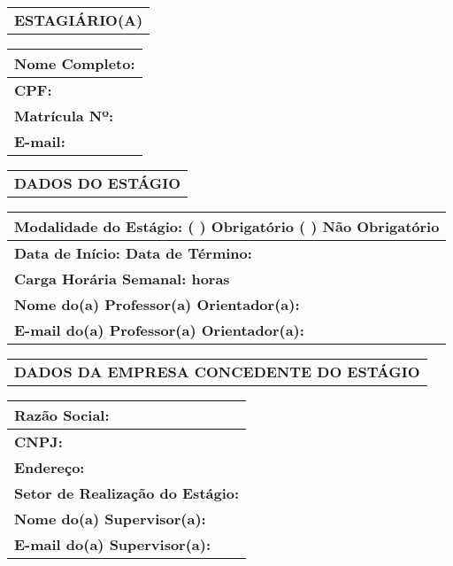 \documentclass[12pt]{article}
\begin{document}
\begin{table}[!ht]
    \centering
    \renewcommand{\arraystretch}{1.3}
    \setlength{\tabcolsep}{10pt}

    \begin{tabular}{p{14cm}} %
        \rowcolor[HTML]{D9D9D9} \textbf{ESTAGIÁRIO(A)} \\
    \end{tabular}

    \begin{tabular}{|p{14cm}|} %
        \hline
        \textbf{Nome Completo:} \\ \hline
        \textbf{CPF:} \\ \hline
        \textbf{Matrícula Nº:} \\ \hline
        \textbf{E-mail:} \\ \hline
    \end{tabular}

    \begin{tabular}{p{14cm}} %
        \rowcolor[HTML]{D9D9D9} \textbf{DADOS DO ESTÁGIO} \\
    \end{tabular}

    \begin{tabular}{|p{14cm}|} %
        \hline
        \textbf{Modalidade do Estágio: (  ) Obrigatório \quad (  ) Não Obrigatório} \\ \hline
        \textbf{Data de Início: \quad Data de Término:} \\ \hline
        \textbf{Carga Horária Semanal: \quad \underline{\hspace{1.5cm}} horas} \\ \hline
        \textbf{Nome do(a) Professor(a) Orientador(a):} \\ \hline
        \textbf{E-mail do(a) Professor(a) Orientador(a):} \\ \hline
    \end{tabular}

    \begin{tabular}{p{14cm}} %
        \rowcolor[HTML]{D9D9D9} \textbf{DADOS DA EMPRESA CONCEDENTE DO ESTÁGIO} \\
    \end{tabular}

    \begin{tabular}{|p{14cm}|} %
        \hline
        \textbf{Razão Social:} \\ \hline
        \textbf{CNPJ:} \\ \hline
        \textbf{Endereço:} \\ \hline
        \textbf{Setor de Realização do Estágio:} \\ \hline
        \textbf{Nome do(a) Supervisor(a):} \\ \hline
        \textbf{E-mail do(a) Supervisor(a):} \\ \hline
    \end{tabular}
\end{table}
\end{document}
